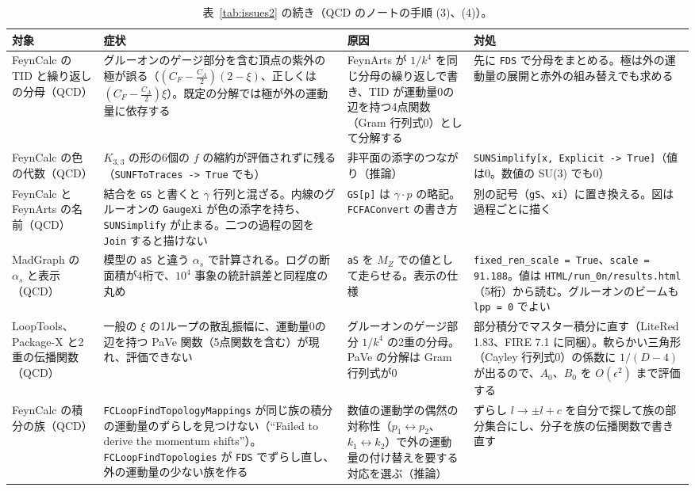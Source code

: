 \documentclass[a4paper,10pt]{ltjsarticle}
\begin{document}
\begin{table}[tbp]
\centering\footnotesize
\caption{表~\ref{tab:issues2} の続き（QCD のノートの手順 (3)、(4)）。}
\label{tab:issues2b}
\begin{tabularx}{\linewidth}{>{\raggedright\arraybackslash}p{2.4cm}>{\raggedright\arraybackslash}X>{\raggedright\arraybackslash}X>{\raggedright\arraybackslash}X}
\toprule
\textbf{対象} & \textbf{症状} & \textbf{原因} & \textbf{対処} \\
\midrule
FeynCalc の TID と繰り返しの分母（QCD） & グルーオンのゲージ部分を含む頂点の紫外の極が誤る（$(C_F-\frac{C_A}2)(2-\xi)$、正しくは $(C_F-\frac{C_A}2)\xi$）。既定の分解では極が外の運動量に依存する & FeynArts が $1/k^4$ を同じ分母の繰り返しで書き、TID が運動量0の辺を持つ4点関数（Gram 行列式0）として分解する & 先に \texttt{FDS} で分母をまとめる。極は外の運動量の展開と赤外の組み替えでも求める \\
FeynCalc の色の代数（QCD） & $K_{3,3}$ の形の6個の $f$ の縮約が評価されずに残る（\texttt{SUNFToTraces -> True} でも） & 非平面の添字のつながり（推論） & \texttt{SUNSimplify[x, Explicit -> True]}（値は0。数値の SU(3) でも0） \\
FeynCalc と FeynArts の名前（QCD） & 結合を \texttt{GS} と書くと $\gamma$ 行列と混ざる。内線のグルーオンの \texttt{GaugeXi} が色の添字を持ち、\texttt{SUNSimplify} が止まる。二つの過程の図を \texttt{Join} すると描けない & \texttt{GS[p]} は $\gamma\cdot p$ の略記。\texttt{FCFAConvert} の書き方 & 別の記号（\texttt{gS}、\texttt{xi}）に置き換える。図は過程ごとに描く \\
MadGraph の $\alpha_s$ と表示（QCD） & 模型の \texttt{aS} と違う $\alpha_s$ で計算される。ログの断面積が4桁で、$10^4$ 事象の統計誤差と同程度の丸め & \texttt{aS} を $M_Z$ での値として走らせる。表示の仕様 & \texttt{fixed\_ren\_scale = True}、\texttt{scale = 91.188}。値は \texttt{HTML/run\_0n/results.html}（5桁）から読む。グルーオンのビームも \texttt{lpp = 0} でよい \\
LoopTools、Package-X と2重の伝播関数（QCD） & 一般の $\xi$ の1ループの散乱振幅に、運動量0の辺を持つ PaVe 関数（5点関数を含む）が現れ、評価できない & グルーオンのゲージ部分 $1/k^4$ の2重の分母。PaVe の分解は Gram 行列式が0 & 部分積分でマスター積分に直す（LiteRed 1.83、FIRE 7.1 に同梱）。軟らかい三角形（Cayley 行列式0）の係数に $1/(D-4)$ が出るので、$A_0$、$B_0$ を $O(\epsilon^2)$ まで評価する \\
FeynCalc の積分の族（QCD） & \texttt{FCLoopFindTopologyMappings} が同じ族の積分の運動量のずらしを見つけない（``Failed to derive the momentum shifts''）。\texttt{FCLoopFindTopologies} が \texttt{FDS} でずらし直し、外の運動量の少ない族を作る & 数値の運動学の偶然の対称性（$p_1\leftrightarrow p_2$、$k_1\leftrightarrow k_2$）で外の運動量の付け替えを要する対応を選ぶ（推論） & ずらし $l\to\pm l+c$ を自分で探して族の部分集合にし、分子を族の伝播関数で書き直す \\

\end{tabularx}
\end{table}
\end{document}
